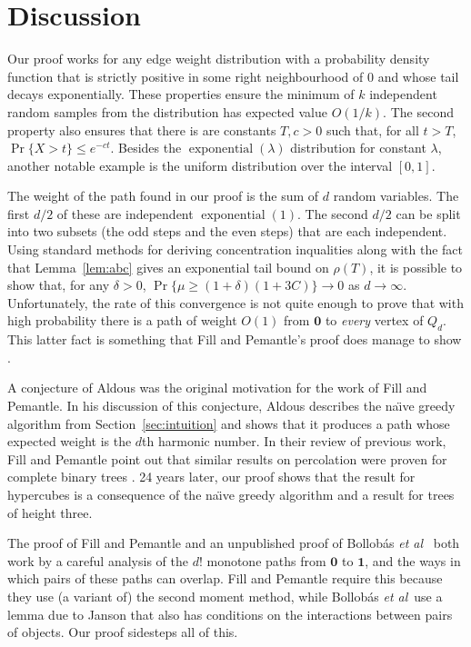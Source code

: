 \documentclass[a4paper,UKenglish]{lipics-v2016}
\DeclareMathOperator{\exponential}{exponential}
\newcommand{\zero}{\mathbf{0}}
\newcommand{\one}{\mathbf{1}}
\newcommand{\etal}{\emph{et al}}
\begin{document}
\section{Discussion}

Our proof works for any edge weight distribution with a probability
density function that is strictly positive in some right neighbourhood
of 0 and whose tail decays exponentially.  These properties ensure the
minimum of $k$ independent random samples from the distribution has
expected value $O(1/k)$. The second property also ensures that there is
are constants $T,c>0$ such that, for all $t>T$, $\Pr\{X > t\}\le e^{-ct}$.
Besides the $\exponential(\lambda)$ distribution for constant $\lambda$,
another notable example is the uniform distribution over the interval
$[0,1]$.

The weight of the path found in our proof is the sum of $d$ random
variables. The first $d/2$ of these are independent $\exponential(1)$. The
second $d/2$ can be split into two subsets (the odd steps and the even
steps) that are each independent.  Using standard methods for deriving
concentration inqualities along with the fact that Lemma~\ref{lem:abc}
gives an exponential tail bound on $\rho(T)$, it is possible to show
that, for any $\delta >0$, $\Pr\{\mu\ge (1+\delta)(1+3C)\}\rightarrow 0$
as $d\rightarrow\infty$.  Unfortunately, the rate of this convergence
is not quite enough to prove that with high probability there is a path
of weight $O(1)$ from $\zero$ to \emph{every} vertex of $Q_d$.
This latter fact is something that Fill and Pemantle's proof does manage
to show \cite{fill.pemantle:percolation}.

A conjecture of Aldous \cite[Conjecture~G7.1]{aldous:probability}
was the original motivation for the work of Fill and Pemantle.  In his
discussion of this conjecture, Aldous describes the na\"{\i}ve greedy
algorithm from Section~\ref{sec:intuition} and shows that it produces a
path whose expected weight is the $d$th harmonic number.  In their review
of previous work, Fill and Pemantle \cite{fill.pemantle:percolation}
point out that similar results on percolation were proven for complete
binary trees \cite{pemantle:phase}.  24 years later, our proof shows
that the result for hypercubes is a consequence of the na\"{\i}ve greedy
algorithm and a result for trees of height three.

The proof of Fill and Pemantle \cite{fill.pemantle:percolation}
and an unpublished proof of Bollob\'as \etal\
\cite{balister.bollobas.ea:first-passage} both work by a careful analysis
of the $d!$ monotone paths from $\zero$ to $\one$, and the ways in which
pairs of these paths can overlap.  Fill and Pemantle require this because
they use (a variant of) the second moment method, while Bollob\'as \etal\
use a lemma due to Janson that also has conditions on the interactions
between pairs of objects. Our proof sidesteps all of this.
\end{document}

